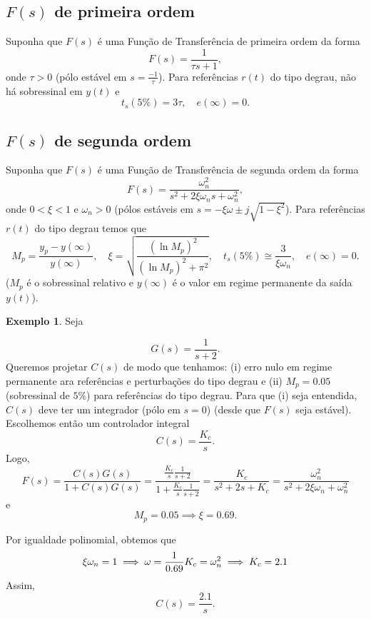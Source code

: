 \documentclass[
]{book}
\theoremstyle{definition}
\theoremstyle{definition}
\newtheorem{example}{Exemplo}[chapter]
\theoremstyle{definition}
\theoremstyle{remark}
\begin{document}
\hypertarget{fs-de-primeira-ordem}{%
\subsection*{\texorpdfstring{\(F(s)\) de primeira ordem}{F(s) de primeira ordem}}\label{fs-de-primeira-ordem}}

Suponha que \(F(s)\) é uma Função de Transferência de primeira ordem da forma
\[
F(s) = \frac{1}{\tau s+1},
\]
onde \(\tau > 0\) (pólo estável em \(s=\frac{-1}{\tau}\)). Para referências \(r(t)\) do tipo degrau, não há sobressinal em \(y(t)\) e
\[
\boxed{t_s(5\%) = 3\tau, \quad e(\infty) =0}.
\]

\hypertarget{fs-de-segunda-ordem}{%
\subsection*{\texorpdfstring{\(F(s)\) de segunda ordem}{F(s) de segunda ordem}}\label{fs-de-segunda-ordem}}

Suponha que \(F(s)\) é uma Função de Transferência de segunda ordem da forma
\[
F(s) = \frac{\omega_n^2}{s^2+2\xi\omega_ns+\omega_n^2},
\]
onde \(0<\xi<1\) e \(\omega_n>0\) (pólos estáveis em \(s=-\xi\omega \pm j \sqrt{1-\xi^2}\)). Para referências \(r(t)\) do tipo degrau temos que
\[
\boxed{M_p=\frac{y_p-y(\infty)}{y(\infty)}, \quad \xi=\sqrt{\frac{(\ln{M_p})^2}{(\ln{M_p})^2+\pi^2}}, \quad t_s(5\%) \cong \frac{3}{\xi\omega_n}, \quad e(\infty) =0}.
\]
(\(M_p\) é o sobressinal relativo e \(y(\infty)\) é o valor em regime permanente da saída \(y(t)\)).

\begin{example}
\protect\hypertarget{exm:unnamed-chunk-9}{}{\label{exm:unnamed-chunk-9} }Seja

\[
G(s) = \frac{1}{s+2}.
\]
Queremos projetar \(C(s)\) de modo que tenhamos: (i) erro nulo em regime permanente ara referências e perturbações do tipo degrau e (ii) \(M_p=0.05\) (sobressinal de \(5\%\)) para referências do tipo degrau. Para que (i) seja entendida, \(C(s)\) deve ter um integrador (pólo em \(s=0\)) (desde que \(F(s)\) seja estável). Escolhemos então um controlador integral
\[
C(s)=\frac{K_c}{s}.
\]
Logo,
\[
F(s) = \frac{C(s)G(s)}{1+C(s)G(s)} = \frac{\frac{K_c}{s}\frac{1}{s+2}}{1+\frac{K_c}{s}\frac{1}{s+2}} = \boxed{\frac{K_c}{s^2+2s+K_c} = \frac{\omega_n^2}{s^2+2\xi\omega_n+\omega^2_n}}
\]
e
\[
M_p=0.05 \implies \boxed{\xi = 0.69}.
\]

Por igualdade polinomial, obtemos que
\[
\xi\omega_n=1 \implies \omega = \frac{1}{0.69}\\
K_c=\omega_n^2 \implies K_c = 2.1
\]
Assim,
\[
\boxed{C(s)=\frac{2.1}{s}}.
\]
\end{example}
\end{document}
